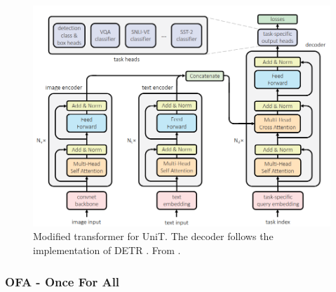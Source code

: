 \documentclass[
]{krantz}
\begin{document}
\begin{figure}

{\centering \includegraphics[width=0.8\linewidth]{figures/03-03-multipurpose/UniT} 

}

\caption{Modified transformer for UniT. The decoder follows the implementation of DETR \citep{Carion2020}. From \citet{Hu2021}.}\label{fig:unit}
\end{figure}



\hypertarget{ofa---once-for-all}{%
\subsubsection{OFA - Once For All}\label{ofa---once-for-all}}
\end{document}
